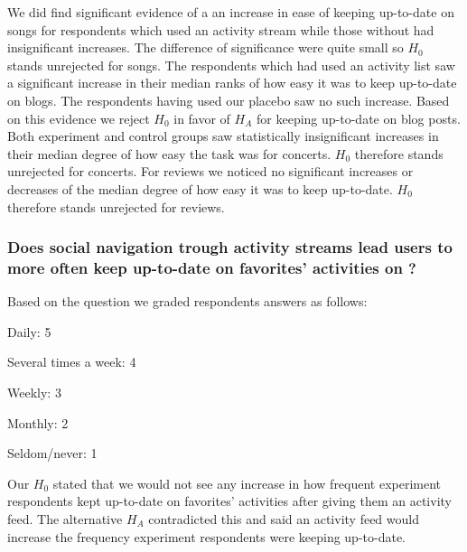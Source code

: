 \begin{items}
   We did find significant evidence
    of a an increase in ease of keeping up-to-date on songs for respondents
    which used an activity stream while those without had insignificant
    increases. The difference of significance were quite small so $H_0$
    stands unrejected for songs.
   The respondents which had used an activity list saw a
    significant increase in their median ranks of how easy it was
    to keep up-to-date on blogs. The respondents having used our placebo
    saw no such increase. Based on this evidence we reject $H_0$ in favor
    of $H_A$ for keeping up-to-date on blog posts.
   Both experiment and control groups saw
    statistically insignificant increases in their median degree of how easy
    the task was for concerts. $H_0$ therefore stands unrejected for concerts.
   For reviews we noticed no significant increases or decreases
    of the median degree of how easy it was to keep up-to-date. 
    $H_0$ therefore stands unrejected for reviews.
\end{items}




\subsubsection{%
  Does social navigation trough activity streams lead users to more often keep
  up-to-date on favorites' activities on \urort{}?
}

Based on the question
we graded respondents answers as follows: 

\begin{items}
  \item Daily: 5
  \item Several times a week: 4
  \item Weekly: 3
  \item Monthly: 2
  \item Seldom/never: 1
\end{items}

Our $H_0$ stated that we would not see any increase in how frequent
experiment respondents kept up-to-date on favorites' activities after giving
them an activity feed. The alternative $H_A$ contradicted this and said
an activity feed would increase the frequency experiment respondents were
keeping up-to-date.

